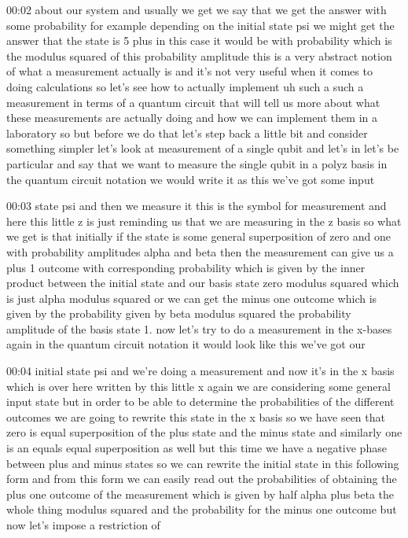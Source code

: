 00:02
about our system and usually we get we say that we get the answer
with some probability for example depending on the initial state
psi we might get the answer that the state
is 5 plus in this case it would be with probability
which is the modulus squared of this probability amplitude
this is a very abstract notion of what a measurement actually is and it's not
very useful when it comes to doing calculations
so let's see how to actually implement uh such a
such a measurement in terms of a quantum circuit that will tell us more about
what these measurements are actually doing and how we can implement them in a
laboratory so but before we do that let's step back a little bit and consider
something simpler let's look at measurement of a single qubit
and let's in let's be particular and say
that we want to measure the single qubit in a polyz basis
in the quantum circuit notation we would write it as this we've got some input

00:03
state psi and then we measure it this is the symbol for measurement and
here this little z is just reminding us that we are measuring in the z
basis so what we get is that initially if the state is some general
superposition of zero and one with probability amplitudes alpha and beta
then the measurement can give us a plus 1 outcome with corresponding probability
which is given by the inner product between the initial state
and our basis state zero modulus squared which is just
alpha modulus squared or we can get the minus one outcome
which is given by the probability given by beta modulus squared
the probability amplitude of the basis state 1.
now let's try to do a measurement in the x-bases
again in the quantum circuit notation it would look like this we've got our

00:04
initial state psi and we're doing a measurement and now it's in the x basis
which is over here written by this little x
again we are considering some general input state but in order to
be able to determine the probabilities of the different outcomes
we are going to rewrite this state in the x basis
so we have seen that zero is equal superposition
of the plus state and the minus state and similarly one is an equals
equal superposition as well but this time we have a negative phase between
plus and minus states so we can rewrite the initial state in this following form
and from this form we can easily read out the probabilities
of obtaining the plus one outcome of the measurement
which is given by half alpha plus beta the whole thing modulus squared and the
probability for the minus one outcome but now let's impose a restriction of

